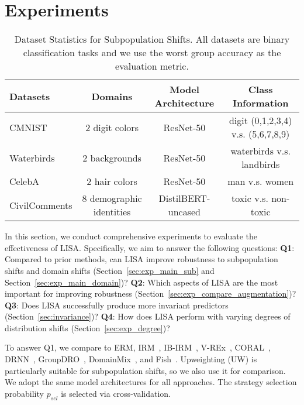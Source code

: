 \section{Experiments}
\label{sec:experiments}
\begin{table*}[h]
\small
\caption{Dataset Statistics for Subpopulation Shifts. All datasets are binary classification tasks and we use the worst group accuracy as the evaluation metric.}
\label{tab:subpopulation_data}
\begin{center}
\begin{tabular}{l|ccc}
\toprule
Datasets  & Domains  & Model Architecture & Class Information \\\midrule
CMNIST & 2 digit colors  & ResNet-50 & digit (0,1,2,3,4) v.s. (5,6,7,8,9)\\
Waterbirds & 2 backgrounds  & ResNet-50 & waterbirds v.s. landbirds\\
CelebA & 2 hair colors & ResNet-50 & man v.s. women\\
CivilComments & 8 demographic
identities & DistilBERT-uncased & toxic v.s. non-toxic \\\bottomrule
\end{tabular}
\end{center}
\vspace{-1.5em}
\end{table*}
In this section, we conduct comprehensive experiments to evaluate the effectiveness of LISA. Specifically, we aim to answer the following questions: \textbf{Q1}: Compared to prior methods, can LISA improve robustness to subpopulation shifts and domain shifts (Section~\ref{sec:exp_main_sub} and Section~\ref{sec:exp_main_domain})? \textbf{Q2}: Which aspects of LISA are the most important for improving robustness (Section~\ref{sec:exp_compare_augmentation})? \textbf{Q3}: Does LISA successfully produce more invariant predictors (Section~\ref{sec:invariance})? \textbf{Q4}: How does LISA perform with varying degrees of distribution shifts (Section~\ref{sec:exp_degree})? 

To answer Q1, we compare to ERM, IRM~\citep{arjovsky2019invariant}, IB-IRM~\citep{ahuja2021invariance}, V-REx~\citep{krueger2021out}, CORAL~\citep{li2018domain}, DRNN~\citep{ganin2015unsupervised}, GroupDRO~\citep{sagawa2019distributionally}, DomainMix~\citep{xu2020adversarial}, and Fish~\citep{shi2021gradient}. Upweighting (UW) is particularly suitable for subpopulation shifts, so we also use it for comparison. We adopt the same model architectures for all approaches. The strategy selection probability $p_{sel}$ is selected via cross-validation.

